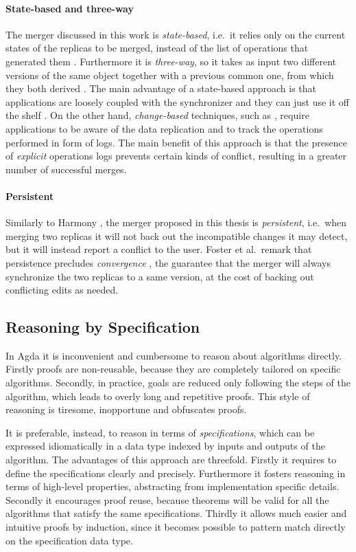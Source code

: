 \documentclass[../Thesis.tex]{subfiles}
\begin{document}
	\paragraph{State-based and three-way}
	The merger discussed in this work is \emph{state-based}, i.e.\ 
	it relies only on the current states of the replicas to be merged, instead
	of the list of operations that generated them \cite{PierceDiff3}.
	Furthermore it is \emph{three-way}, so it takes as input two different 
	versions of the same object together with a previous common one, 
	from which they both derived \cite{PierceDiff3}.	
	The main advantage of a state-based approach is that applications
	are loosely coupled with the synchronizer and they can just use it
	off the shelf \cite{PierceDiff3}.
	On the other hand, \emph{change-based} techniques, such as 
	\cite{Ramsey01}, require applications	to be aware of the data replication
	and to track the operations performed in form of logs.
	The main benefit of this approach is that the presence of \emph{explicit}
	operations logs prevents certain kinds of conflict, resulting in a
	greater number of successful merges.
		
	\paragraph{Persistent}
	Similarly to Harmony \cite{Pierce07}, the merger proposed in 
	this thesis is \emph{persistent}, i.e.\ when merging two replicas 
	it will not back out the incompatible changes it may detect, 
	but it will instead report a conflict to the user.
	Foster et al.\ remark that persistence precludes 
	\emph{convergence} \cite{Pierce07}, the guarantee
	that the merger will always synchronize the two replicas to a same version, 
	at the cost of backing out conflicting edits as needed.
	
	\subsection{Reasoning by Specification}
	\label{subsec:spec}
	In Agda it is inconvenient and cumbersome to reason about algorithms directly.
	Firstly proofs are non-reusable, because they are completely tailored 
	on specific algorithms.
	Secondly, in practice,  goals are reduced only following the steps
	of the algorithm,	which leads to overly long and repetitive proofs. 
	This style of reasoning is tiresome, inopportune and obfuscates proofs.

	It is preferable, instead, to reason in terms of \emph{specifications}, which
	can be expressed idiomatically in a data type indexed by inputs
	and outputs of the algorithm. 
	The advantages of this approach are threefold.
	Firstly it requires to define the specifications clearly and precisely.
	Furthermore it fosters 	reasoning in terms of high-level properties, 
	abstracting from implementation specific details.
	Secondly it encourages proof reuse, because theorems will be valid for
	all the algorithms that satisfy the same specifications.
	Thirdly it allows much easier and intuitive proofs by induction, since it 
	becomes possible to pattern match directly on the specification data type.
	
\end{document}

